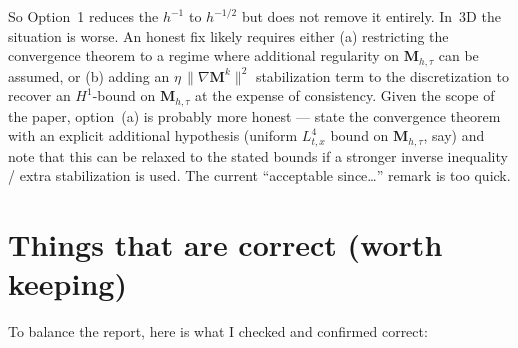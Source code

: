 \documentclass[11pt]{article}
\newcommand{\bM}{\mathbf{M}}
\newcommand{\dt}{\tau}
\begin{document}
So Option~1 reduces the $h^{-1}$ to $h^{-1/2}$ but does not remove
it entirely.  In~3D the situation is worse.  An honest fix likely
requires either (a) restricting the convergence theorem to a regime
where additional regularity on $\bM_{h,\dt}$ can be assumed, or (b)
adding an $\eta\,\|\nabla\bM^{k}\|^{2}$ stabilization term to the
discretization to recover an $H^{1}$-bound on $\bM_{h,\dt}$ at the
expense of consistency.  Given the scope of the paper, option~(a) is
probably more honest --- state the convergence theorem with an
explicit additional hypothesis (uniform $L^{4}_{t,x}$ bound on
$\bM_{h,\dt}$, say) and note that this can be relaxed to the stated
bounds if a stronger inverse inequality / extra stabilization is
used.  The current ``acceptable since\ldots'' remark is too quick.

\section*{Things that are correct (worth keeping)}

To balance the report, here is what I checked and confirmed correct:
\end{document}
